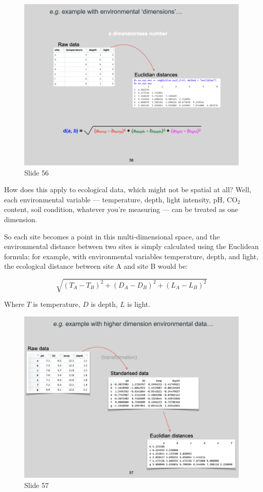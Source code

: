 \documentclass[
  10pt,
]{book}
\begin{document}
\begin{figure}[ht]
\centering
\includegraphics[width=0.8\linewidth]{../images/BDC334/BDC334-056.jpeg}
\caption*{Slide 56}
\end{figure}

How does this apply to ecological data, which might not be spatial at
all? Well, each environmental variable --- temperature, depth, light
intensity, pH, CO\(_2\) content, soil condition, whatever you're
measuring --- can be treated as one dimension.

So each site becomes a point in this multi-dimensional space, and the
environmental distance between two sites is simply calculated using the
Euclidean formula: for example, with environmental variables
temperature, depth, and light, the ecological distance between site A
and site B would be:

\[
\sqrt{(T_A - T_B)^2 + (D_A - D_B)^2 + (L_A - L_B)^2}
\]

Where \(T\) is temperature, \(D\) is depth, \(L\) is light.

\begin{figure}[ht]
\centering
\includegraphics[width=0.8\linewidth]{../images/BDC334/BDC334-057.jpeg}
\caption*{Slide 57}
\end{figure}
\end{document}
